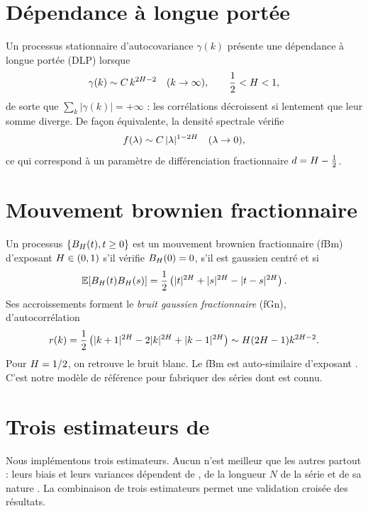 \section{Dépendance à longue portée}
\label{sec:dlp}
Un processus stationnaire d'autocovariance $\gamma(k)$ présente une dépendance à longue portée (DLP) lorsque
\begin{equation}
\gamma(k) \sim C\, k^{2H-2} \quad (k \to \infty), \qquad \frac{1}{2} < H < 1,
\end{equation}
de sorte que $\sum_k |\gamma(k)| = +\infty$ : les corrélations décroissent si lentement que leur somme diverge. De façon équivalente, la densité spectrale vérifie
\begin{equation}
f(\lambda) \sim C\, |\lambda|^{1-2H} \quad (\lambda \to 0),
\label{eq:spectre}
\end{equation}
ce qui correspond à un paramètre de différenciation fractionnaire $d = H - \frac{1}{2}$.

\section{Mouvement brownien fractionnaire}
\label{sec:fbm}
Un processus $\{B_H(t), t \ge 0\}$ est un mouvement brownien fractionnaire (fBm) d'exposant $H \in (0, 1)$ s'il vérifie $B_H(0) = 0$, s'il est gaussien centré et si
\begin{equation}
\mathbb{E}[B_H(t)B_H(s)] = \frac{1}{2}\left(|t|^{2H} + |s|^{2H} - |t-s|^{2H}\right).
\end{equation}
Ses accroissements forment le \emph{bruit gaussien fractionnaire} (fGn), d'autocorrélation
\begin{equation}
r(k) = \frac{1}{2}\left(|k+1|^{2H} - 2|k|^{2H} + |k-1|^{2H}\right) \sim H(2H-1)k^{2H-2}.
\end{equation}
Pour $H = 1/2$, on retrouve le bruit blanc. Le fBm est auto-similaire d'exposant \Hurst. C'est notre modèle de référence pour fabriquer des séries dont \Hurst{} est connu.

\section{Trois estimateurs de \Hurst}
\label{sec:estimateurs}
Nous implémentons trois estimateurs. Aucun n'est meilleur que les autres partout : leurs biais et leurs variances dépendent de \Hurst, de la longueur $N$ de la série et de sa nature \cite{taqqu1995,beran1994}. La combinaison de trois estimateurs permet une validation croisée des résultats.

